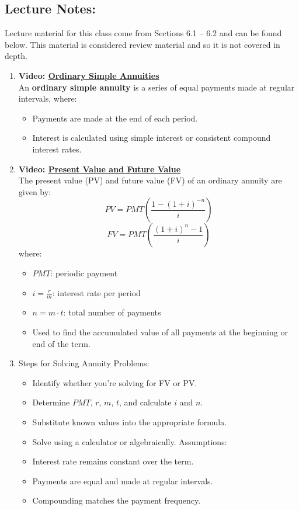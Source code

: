 \documentclass[
]{book}
\providecommand{\tightlist}{%
  \setlength{\itemsep}{0pt}\setlength{\parskip}{0pt}}
\begin{document}
\subsection*{Lecture Notes:}\label{lecture-notes-12}

Lecture material for this class come from Sections 6.1 -- 6.2 and can be found below. This material is considered review material and so it is not covered in depth.

\begin{enumerate}
\def\labelenumi{\arabic{enumi}.}
\tightlist
\item
  \textbf{Video: \href{https://youtu.be/QSn8-A0wNZo}{Ordinary Simple Annuities}}\\
  An \textbf{ordinary simple annuity} is a series of equal payments made at regular intervals, where:

  \begin{itemize}
  \tightlist
  \item
    Payments are made at the end of each period.
  \item
    Interest is calculated using simple interest or consistent compound interest rates.
  \end{itemize}
\item
  \textbf{Video: \href{https://youtu.be/UGp2LF-J0Mo}{Present Value and Future Value}}\\
  The present value (PV) and future value (FV) of an ordinary annuity are given by:
  \[
   PV = PMT \left( \frac{1 - (1 + i)^{-n}}{i} \right)
   \]
  \[
   FV = PMT \left( \frac{(1 + i)^n - 1}{i} \right)
   \] where:

  \begin{itemize}
  \tightlist
  \item
    \(PMT\): periodic payment
  \item
    \(i = \frac{r}{m}\): interest rate per period
  \item
    \(n = m \cdot t\): total number of payments
  \item
    Used to find the accumulated value of all payments at the beginning or end of the term.
  \end{itemize}
\item
  Steps for Solving Annuity Problems:

  \begin{itemize}
  \tightlist
  \item
    Identify whether you're solving for FV or PV.
  \item
    Determine \(PMT\), \(r\), \(m\), \(t\), and calculate \(i\) and \(n\).
  \item
    Substitute known values into the appropriate formula.
  \item
    Solve using a calculator or algebraically.
    Assumptions:
  \item
    Interest rate remains constant over the term.
  \item
    Payments are equal and made at regular intervals.
  \item
    Compounding matches the payment frequency.
  \end{itemize}
\end{enumerate}
\end{document}
